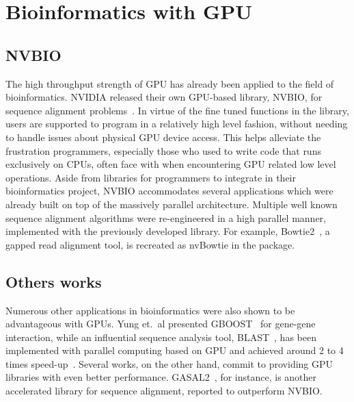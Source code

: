 \documentclass{PHlab-thesis}
\begin{document}
\section{Bioinformatics with GPU}
\subsection{NVBIO}
The high throughput strength of GPU has already been applied to the field of bioinformatics. NVIDIA released their own GPU-based library, NVBIO, for sequence alignment problems~\cite{nvbio2015}. In virtue of the fine tuned functions in the library, users are supported to program in a relatively high level fashion, without needing to handle issues about physical GPU device access. This helps alleviate the frustration programmers, especially those who used to write code that runs exclusively on CPUs, often face with when encountering GPU related low level operations. Aside from libraries for programmers to integrate in their bioinformatics project, NVBIO accommodates several applications which were already built on top of the massively parallel architecture. Multiple well known sequence alignment algorithms were re-engineered in a high parallel manner, implemented with the previously developed library. For example, Bowtie2~\cite{langmead2012fast}, a gapped read alignment tool, is recreated as nvBowtie in the package.
\subsection{Others works}
Numerous other applications in bioinformatics were also shown to be advantageous with GPUs. Yung et.\ al presented GBOOST~\cite{yung2011gboost} for gene-gene interaction, while an influential sequence analysis tool, BLAST~\cite{altschul1990basic}, has been implemented with parallel computing based on GPU and achieved around 2 to 4 times speed-up~\cite{vouzis2011gpu}. Several works, on the other hand, commit to providing GPU libraries with even better performance. GASAL2~\cite{ahmed2019gasal2}, for instance, is another accelerated library for sequence alignment, reported to outperform NVBIO. 
\end{document}
